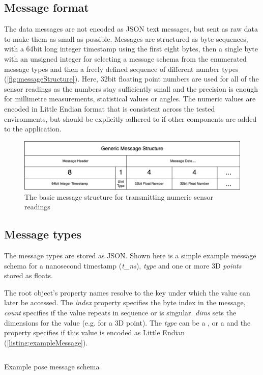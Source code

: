 \subsection{Message format}

The data messages are not encoded as \ac{JSON} text messages, but sent as raw data to make them as small as possible. Messages are structured as byte sequences, with a 64bit long integer timestamp using the first eight bytes, then a single byte with an unsigned integer for selecting a message schema from the enumerated message types and then a freely defined sequence of different number types (\autoref{fig:messageStructure}). Here, 32bit floating point numbers are used for all of the sensor readings as the numbers stay sufficiently small and the precision is enough for millimetre measurements, statistical values or angles. The numeric values are encoded in Little Endian format that is consistent across the tested environments, but should be explicitly adhered to if other components are added to the application.

\begin{figure}[h]
\centering
\includegraphics[width=\textwidth]{04_Artefakte/01_Abbildungen/generic-message-structure}
\caption[Generic Message Structure]{The basic message structure for transmitting numeric sensor readings\protect}
\label{fig:messageStructure}
\end{figure}

\subsection{Message types}

The message types are stored as JSON. Shown here is a simple example message schema for a nanosecond timestamp (\emph{{t\_ns}}), \emph{type} and one or more \ac{3D} \emph{points} stored as floats.

The root object's property names resolve to the key under which the value can later be accessed. The \emph{index} property specifies the byte index in the message, \emph{count} specifies if the value repeats in sequence or is singular. \emph{dims} sets the dimensions for the value (e.g.  for a \ac{3D} point). The \emph{type} can be a ,  or a  and the property  specifies if this value is encoded as Little Endian (\autoref{listing:exampleMessage}).

\begin{listing}[!ht]
\inputminted{json}{04_Artefakte/03_Listings/example-pose-message.json}
\caption{Example pose message schema}
\label{listing:exampleMessage}
\end{listing}
